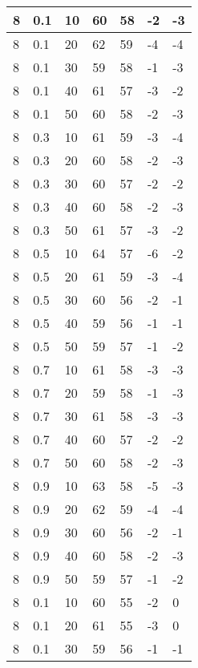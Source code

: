 \begin{longtable}{|l|l|l|l|l|l|l|}
		8     & 0.1 & 10   & 60 & 58 & -2  & -3  \\ \hline
		8     & 0.1 & 20   & 62 & 59 & -4  & -4  \\ \hline
		8     & 0.1 & 30   & 59 & 58 & -1  & -3  \\ \hline
		8     & 0.1 & 40   & 61 & 57 & -3  & -2  \\ \hline
		8     & 0.1 & 50   & 60 & 58 & -2  & -3  \\ \hline
		8     & 0.3 & 10   & 61 & 59 & -3  & -4  \\ \hline
		8     & 0.3 & 20   & 60 & 58 & -2  & -3  \\ \hline
		8     & 0.3 & 30   & 60 & 57 & -2  & -2  \\ \hline
		8     & 0.3 & 40   & 60 & 58 & -2  & -3  \\ \hline
		8     & 0.3 & 50   & 61 & 57 & -3  & -2  \\ \hline
		8     & 0.5 & 10   & 64 & 57 & -6  & -2  \\ \hline
		8     & 0.5 & 20   & 61 & 59 & -3  & -4  \\ \hline
		8     & 0.5 & 30   & 60 & 56 & -2  & -1  \\ \hline
		8     & 0.5 & 40   & 59 & 56 & -1  & -1  \\ \hline
		8     & 0.5 & 50   & 59 & 57 & -1  & -2  \\ \hline
		8     & 0.7 & 10   & 61 & 58 & -3  & -3  \\ \hline
		8     & 0.7 & 20   & 59 & 58 & -1  & -3  \\ \hline
		8     & 0.7 & 30   & 61 & 58 & -3  & -3  \\ \hline
		8     & 0.7 & 40   & 60 & 57 & -2  & -2  \\ \hline
		8     & 0.7 & 50   & 60 & 58 & -2  & -3  \\ \hline
		8     & 0.9 & 10   & 63 & 58 & -5  & -3  \\ \hline
		8     & 0.9 & 20   & 62 & 59 & -4  & -4  \\ \hline
		8     & 0.9 & 30   & 60 & 56 & -2  & -1  \\ \hline
		8     & 0.9 & 40   & 60 & 58 & -2  & -3  \\ \hline
		8     & 0.9 & 50   & 59 & 57 & -1  & -2  \\ \hline
		8     & 0.1 & 10   & 60 & 55 & -2  & 0   \\ \hline
		8     & 0.1 & 20   & 61 & 55 & -3  & 0   \\ \hline
		8     & 0.1 & 30   & 59 & 56 & -1  & -1  \\ \hline

\end{longtable}
